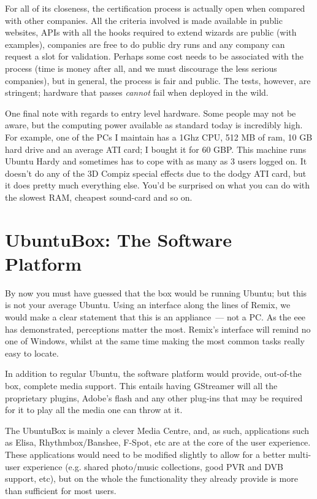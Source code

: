 \documentclass{book}
\begin{document}
For all of its closeness, the certification process is actually open
when compared with other companies. All the criteria involved is made
available in public websites, APIs with all the hooks required to
extend wizards are public (with examples), companies are free to do
public dry runs and any company can request a slot for
validation. Perhaps some cost needs to be associated with the process
(time is money after all, and we must discourage the less serious
companies), but in general, the process is fair and public. The tests,
however, are stringent; hardware that passes \emph{cannot} fail when
deployed in the wild.

One final note with regards to entry level hardware. Some people may
not be aware, but the computing power available as standard today is
incredibly high. For example, one of the PCs I maintain has a 1Ghz
CPU, 512 MB of ram, 10 GB hard drive and an average ATI card; I bought
it for 60 GBP. This machine runs Ubuntu Hardy and sometimes has to
cope with as many as 3 users logged on. It doesn't do any of the 3D
Compiz special effects due to the dodgy ATI card, but it does pretty
much everything else. You'd be surprised on what you can do with the
slowest RAM, cheapest sound-card and so on.

\section{UbuntuBox: The Software Platform}

By now you must have guessed that the box would be running Ubuntu; but
this is not your average Ubuntu. Using an interface along the lines of
Remix, we would make a clear statement that this is an appliance~---
not a PC. As the eee has demonstrated, perceptions matter the
most. Remix's interface will remind no one of Windows, whilst at the
same time making the most common tasks really easy to locate.

In addition to regular Ubuntu, the software platform would provide,
out-of-the box, complete media support. This entails having GStreamer
will all the proprietary plugins, Adobe's flash and any other plug-ins
that may be required for it to play all the media one can throw at it.

The UbuntuBox is mainly a clever Media Centre, and, as such,
applications such as Elisa, Rhythmbox/Banshee, F-Spot, etc are at the
core of the user experience. These applications would need to be
modified slightly to allow for a better multi-user experience
(e.g. shared photo/music collections, good PVR and DVB support, etc),
but on the whole the functionality they already provide is more than
sufficient for most users.
\end{document}
